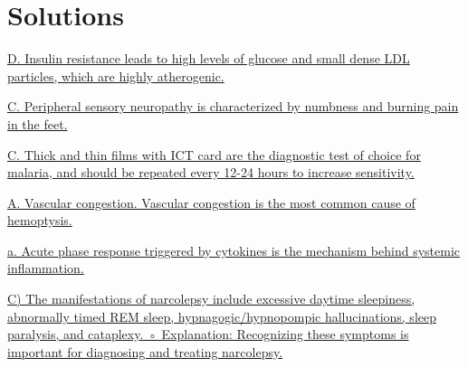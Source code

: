 \documentclass[10pt, a4paper]{article}
\begin{document}
 \section{Solutions} 

 \begin{multicols}{2} 
\begin{enumerate} 

\parbox{\linewidth}{\item \href{https://www.notion.so/Cardiometabolic-Syndrome-2217e00035bb4d999ce7d5b4f16ff92d}{ D. Insulin resistance leads to high levels of glucose and small dense LDL particles, which are highly atherogenic.}} 

 \vspace{6pt} 

\parbox{\linewidth}{\item \href{https://www.notion.so/Complications-of-diabetes-8ddddcd5b33741798fc788acb1719161}{ C. Peripheral sensory neuropathy is characterized by numbness and burning pain in the feet.}} 

 \vspace{6pt} 

\parbox{\linewidth}{\item \href{https://www.notion.so/Travel-Medicine-9056ae798e724a16b56ec93bf312ef5a}{ C. Thick and thin films with ICT card are the diagnostic test of choice for malaria, and should be repeated every 12-24 hours to increase sensitivity.}} 

 \vspace{6pt} 

\parbox{\linewidth}{\item \href{https://www.notion.so/Haemoptysis-Shortness-of-Breath-1231f6571aef41418d3ddfecbcca0294}{ A. Vascular congestion. Vascular congestion is the most common cause of hemoptysis.}} 

 \vspace{6pt} 

\parbox{\linewidth}{\item \href{https://www.notion.so/Rheumatological-Red-Flags-f1e272d9fc58490c91d0dc71957262dc}{ a. Acute phase response triggered by cytokines is the mechanism behind systemic inflammation.}} 

 \vspace{6pt} 

\parbox{\linewidth}{\item \href{https://www.notion.so/Sleep-Disorders-9096f10c9d284955b5fb754965e66fea}{ C) The manifestations of narcolepsy include excessive daytime sleepiness, abnormally timed REM sleep, hypnagogic/hypnopompic hallucinations, sleep paralysis, and cataplexy.
    ◦ Explanation: Recognizing these symptoms is important for diagnosing and treating narcolepsy.}} 


\end{enumerate}
\end{multicols}
\end{document}
